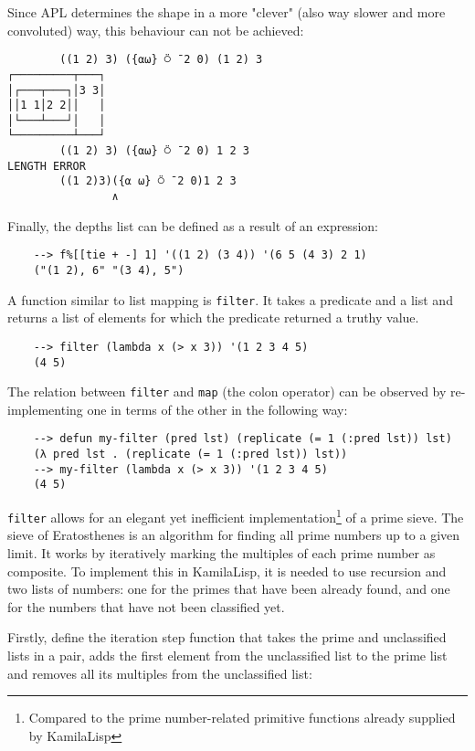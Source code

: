 Since APL determines the shape in a more "clever" (also way slower and more convoluted) way, this behaviour can not be achieved:

\begin{Verbatim}
        ((1 2) 3) ({⍺⍵} ⍥ ¯2 0) (1 2) 3
┌─────────┬───┐
│┌───┬───┐│3 3│
││1 1│2 2││   │
│└───┴───┘│   │
└─────────┴───┘
        ((1 2) 3) ({⍺⍵} ⍥ ¯2 0) 1 2 3
LENGTH ERROR
        ((1 2)3)({⍺ ⍵} ⍥ ¯2 0)1 2 3
                ∧
\end{Verbatim}

Finally, the depths list can be defined as a result of an expression:

\begin{Verbatim}
    --> f%[[tie + -] 1] '((1 2) (3 4)) '(6 5 (4 3) 2 1)
    ("(1 2), 6" "(3 4), 5")
\end{Verbatim}

A function similar to list mapping is \verb|filter|. It takes a predicate and a list and returns a list of elements for which the predicate returned a truthy value.

\begin{Verbatim}
    --> filter (lambda x (> x 3)) '(1 2 3 4 5)
    (4 5)
\end{Verbatim}

The relation between \verb|filter| and \verb|map| (the colon operator) can be observed by re-implementing one in terms of the other in the following way:

\begin{Verbatim}
    --> defun my-filter (pred lst) (replicate (= 1 (:pred lst)) lst)
    (λ pred lst . (replicate (= 1 (:pred lst)) lst))
    --> my-filter (lambda x (> x 3)) '(1 2 3 4 5)
    (4 5)
\end{Verbatim}

\verb|filter| allows for an elegant yet inefficient implementation\footnote{Compared to the prime number-related primitive functions already supplied by KamilaLisp} of a prime sieve. The sieve of Eratosthenes is an algorithm for finding all prime numbers up to a given limit. It works by iteratively marking the multiples of each prime number as composite. To implement this in KamilaLisp, it is needed to use recursion and two lists of numbers: one for the primes that have been already found, and one for the numbers that have not been classified yet.

Firstly, define the iteration step function that takes the prime and unclassified lists in a pair, adds the first element from the unclassified list to the prime list and removes all its multiples from the unclassified list:

